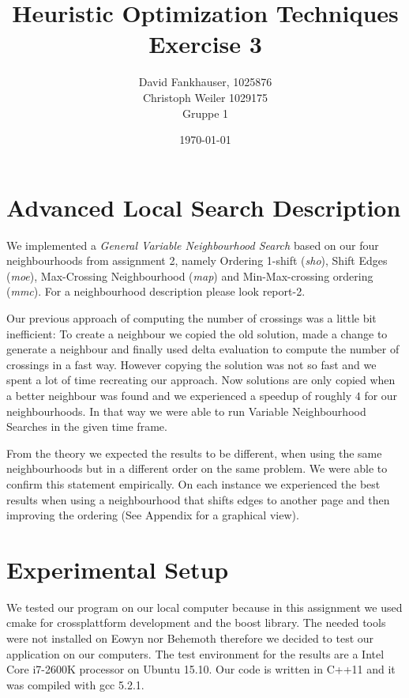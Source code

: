 \documentclass[11pt]{article}
\title{\textbf{Heuristic Optimization Techniques }\\Exercise 3}
\author{David Fankhauser, 1025876\\ Christoph Weiler 1029175\\Gruppe 1}
\date{\today}
\begin{document}
\lstset{language=C++}
\maketitle
 
\section{Advanced Local Search Description}
We implemented a \textit{General Variable Neighbourhood Search} based on our four neighbourhoods from assignment 2, namely Ordering 1-shift (\textit{sho}), Shift Edges (\textit{moe}), 
Max-Crossing Neighbourhood (\textit{map}) and Min-Max-crossing ordering (\textit{mmc}).
For a neighbourhood description please look report-2.

Our previous approach of computing the number of crossings was a little bit inefficient: To create a neighbour we copied the old solution, made a change to generate a neighbour and finally used delta evaluation to compute the number of crossings in a fast way.
However copying the solution was not so fast and we spent a lot of time recreating our approach.
Now solutions are only copied when a better neighbour was found and we experienced a speedup of roughly $4$ for our neighbourhoods.
In that way we were able to run Variable Neighbourhood Searches in the given time frame.

From the theory we expected the results to be different, when using the same neighbourhoods but in a different order on the same problem.
We were able to confirm this statement empirically.
On each instance we experienced the best results when using a neighbourhood that shifts edges to another page and then improving the ordering (See Appendix for a graphical view).

\section{Experimental Setup}
We tested our program on our local computer because in this assignment we used cmake for crossplattform development and the boost library.
The needed tools were not installed on Eowyn nor Behemoth therefore we decided to test our application on our computers.
The test environment for the results are a Intel Core i7-2600K processor on Ubuntu 15.10.
Our code is written in C++11 and it was compiled with gcc 5.2.1.

\newpage
\end{document}
